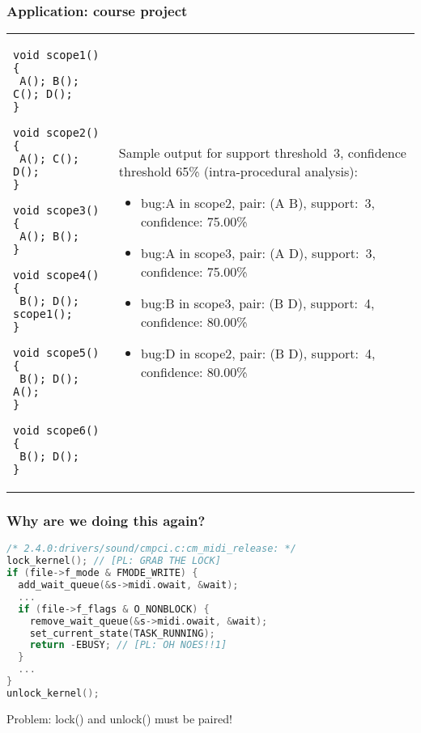 \documentclass{beamer}
\newenvironment{changemargin}[1]{%
  \begin{list}{}{%
    \setlength{\topsep}{0pt}%
    \setlength{\leftmargin}{#1}%
    \setlength{\rightmargin}{1em}
    \setlength{\listparindent}{\parindent}%
    \setlength{\itemindent}{\parindent}%
    \setlength{\parsep}{\parskip}%
  }%
  \item[]}{\end{list}}
\begin{document}
\begin{frame}[fragile]
\frametitle{Application: course project}
\begin{tabular}{ll}
\begin{minipage}{10em}
\scriptsize
\begin{lstlisting}
void scope1() {
 A(); B(); C(); D();
}

void scope2() {
 A(); C(); D();
}

void scope3() {
 A(); B();
}

void scope4() {
 B(); D(); scope1();
}

void scope5() {
 B(); D(); A();
}

void scope6() {
 B(); D();
}
\end{lstlisting}
\end{minipage} &\begin{minipage}{18em}
Sample output for support threshold~3, confidence threshold 65\% (intra-procedural analysis):
\small
\begin{itemize}
\item bug:A in scope2, pair: (A B), support:~3, confidence: 75.00\%
\item bug:A in scope3, pair: (A D), support:~3, confidence: 75.00\%
\item bug:B in scope3, pair: (B D), support:~4, confidence: 80.00\%
\item bug:D in scope2, pair: (B D), support:~4, confidence: 80.00\%
\end{itemize}
\end{minipage}
\end{tabular}
\end{frame}

\begin{frame}[fragile]
  \frametitle{Why are we doing this again?}
    \begin{lstlisting}[language=C,commentstyle={\color{red}\bf}]
/* 2.4.0:drivers/sound/cmpci.c:cm_midi_release: */
lock_kernel(); // [PL: GRAB THE LOCK]
if (file->f_mode & FMODE_WRITE) {
  add_wait_queue(&s->midi.owait, &wait);
  ...
  if (file->f_flags & O_NONBLOCK) {
    remove_wait_queue(&s->midi.owait, &wait);
    set_current_state(TASK_RUNNING);
    return -EBUSY; // [PL: OH NOES!!1]
  }
  ...
}
unlock_kernel();
    \end{lstlisting}
    \begin{changemargin}{1cm}
      \Large
      Problem: lock() and unlock() must be paired!
  \end{changemargin}
\end{frame}
\end{document}
